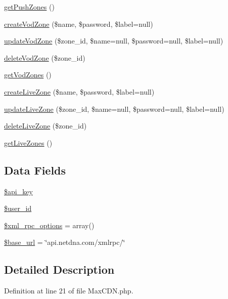 \begin{DoxyCompactItemize}
\hyperlink{class_max_c_d_n_a16b0ec27cb42588cc908b1fa1fb5dc3b}{getPushZones} ()
\item 
\hyperlink{class_max_c_d_n_aa692957f148655dfb52b57856752cb1a}{createVodZone} (\$name, \$password, \$label=null)
\item 
\hyperlink{class_max_c_d_n_a9dbe6ee3e3316947a53c7449b5058cdb}{updateVodZone} (\$zone\_\-id, \$name=null, \$password=null, \$label=null)
\item 
\hyperlink{class_max_c_d_n_a44ef0c0f3348b3823a827d4f8fd1f69b}{deleteVodZone} (\$zone\_\-id)
\item 
\hyperlink{class_max_c_d_n_a252e5eb5e92bda7e596ef52038156db8}{getVodZones} ()
\item 
\hyperlink{class_max_c_d_n_a541ec1657aca049f04e53517f95d8bf6}{createLiveZone} (\$name, \$password, \$label=null)
\item 
\hyperlink{class_max_c_d_n_a887cf925e7b0137f584f75c0ea253a64}{updateLiveZone} (\$zone\_\-id, \$name=null, \$password=null, \$label=null)
\item 
\hyperlink{class_max_c_d_n_a4a95c42a3716d9f45be0cbe37db33ff9}{deleteLiveZone} (\$zone\_\-id)
\item 
\hyperlink{class_max_c_d_n_a1492bb1d403e0e37bbb6694ceade7431}{getLiveZones} ()
\end{DoxyCompactItemize}
\subsection*{Data Fields}
\begin{DoxyCompactItemize}
\item 
\hyperlink{class_max_c_d_n_a186dfe06d14a3bc248c4eb4bcdaec562}{\$api\_\-key}
\item 
\hyperlink{class_max_c_d_n_af0fcd925f00973e32f7214859dfb3c6b}{\$user\_\-id}
\item 
\hyperlink{class_max_c_d_n_aa9300810e8d9adff7d3fdc176c218363}{\$xml\_\-rpc\_\-options} = array()
\item 
\hyperlink{class_max_c_d_n_a6886427c9c643f707fcb35c018049bc7}{\$base\_\-url} = \char`\"{}api.netdna.com/xmlrpc/\char`\"{}
\end{DoxyCompactItemize}


\subsection{Detailed Description}


Definition at line 21 of file MaxCDN.php.



